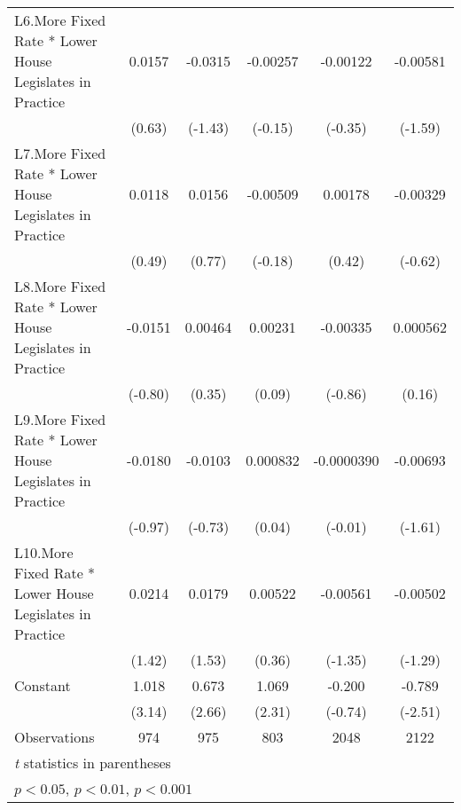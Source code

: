 {\begin{longtable}{l*{5}{c}}
\addlinespace
L6.More Fixed Rate * Lower House Legislates in Practice&   0.0157         &  -0.0315         & -0.00257         & -0.00122         & -0.00581         \\
                &   (0.63)         &  (-1.43)         &  (-0.15)         &  (-0.35)         &  (-1.59)         \\
\addlinespace
L7.More Fixed Rate * Lower House Legislates in Practice&   0.0118         &   0.0156         & -0.00509         &  0.00178         & -0.00329         \\
                &   (0.49)         &   (0.77)         &  (-0.18)         &   (0.42)         &  (-0.62)         \\
\addlinespace
L8.More Fixed Rate * Lower House Legislates in Practice&  -0.0151         &  0.00464         &  0.00231         & -0.00335         & 0.000562         \\
                &  (-0.80)         &   (0.35)         &   (0.09)         &  (-0.86)         &   (0.16)         \\
\addlinespace
L9.More Fixed Rate * Lower House Legislates in Practice&  -0.0180         &  -0.0103         & 0.000832         &-0.0000390         & -0.00693         \\
                &  (-0.97)         &  (-0.73)         &   (0.04)         &  (-0.01)         &  (-1.61)         \\
\addlinespace
L10.More Fixed Rate * Lower House Legislates in Practice&   0.0214         &   0.0179         &  0.00522         & -0.00561         & -0.00502         \\
                &   (1.42)         &   (1.53)         &   (0.36)         &  (-1.35)         &  (-1.29)         \\
\addlinespace
Constant        &    1.018\sym{**} &    0.673\sym{**} &    1.069\sym{*}  &   -0.200         &   -0.789\sym{*}  \\
                &   (3.14)         &   (2.66)         &   (2.31)         &  (-0.74)         &  (-2.51)         \\
\midrule
Observations    &      974         &      975         &      803         &     2048         &     2122         \\
\bottomrule
\multicolumn{6}{l}{\footnotesize \textit{t} statistics in parentheses}\\
\multicolumn{6}{l}{\footnotesize \sym{*} \(p<0.05\), \sym{**} \(p<0.01\), \sym{***} \(p<0.001\)}\\
\end{longtable}
}
